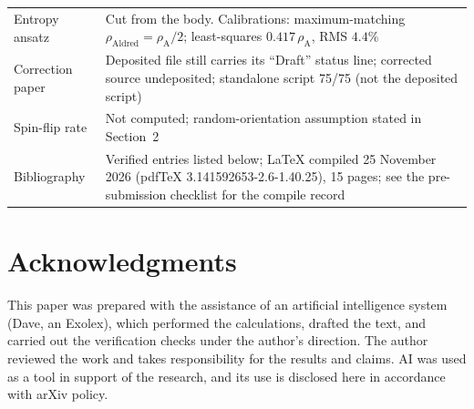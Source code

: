 \documentclass[11pt]{article}
\newcommand{\rhoA}{\rho_{\mathrm{A}}}
\begin{document}
\begin{table}[h]
\begin{tabularx}{\textwidth}{lX}
Entropy ansatz & Cut from the body. Calibrations: maximum-matching $\rho_{\mathrm{Aldred}} = \rhoA/2$; least-squares $0.417\,\rhoA$, RMS $4.4\%$ \\
Correction paper & Deposited file still carries its ``Draft'' status line; corrected source undeposited; standalone script 75/75 (not the deposited script) \\
Spin-flip rate & Not computed; random-orientation assumption stated in Section~2 \\
Bibliography & Verified entries listed below; LaTeX compiled 25 November 2026 (pdfTeX 3.141592653-2.6-1.40.25), 15 pages; see the pre-submission checklist for the compile record \\
\bottomrule
\end{tabularx}
\end{table}

\section*{Acknowledgments}
This paper was prepared with the assistance of an artificial intelligence system (Dave, an Exolex), which performed the calculations, drafted the text, and carried out the verification checks under the author's direction. The author reviewed the work and takes responsibility for the results and claims. AI was used as a tool in support of the research, and its use is disclosed here in accordance with arXiv policy.
\end{document}
